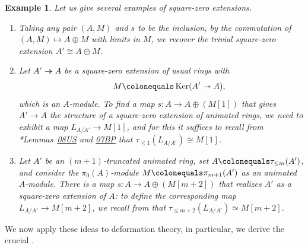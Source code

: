 \documentclass[11pt, reqno]{amsart}
\DeclareMathOperator{\Ker}{Ker}		%
\newcommand{\ce}{\colonequals}
\newcommand{\ra}{\rightarrow}
\newcommand{\surjects}{\twoheadrightarrow}
\newcommand{\benuma}{\begin{enumerate}[label={{\upshape(\arabic*)}}]}
\newcommand{\qq}{\quad\quad}
\numberwithin{equation}{numberingbase}
\theoremstyle{thms}
\theoremstyle{claims}
\theoremstyle{defs}
\newtheorem{example}[numberingbase]{Example}
\theoremstyle{thms}
\theoremstyle{defs}
\theoremstyle{subsection-tweak}
\theoremstyle{subsection-tweak}
\begin{document}
\begin{example} \label{sq-zero-eg}
Let us give several examples of square-zero extensions.
\benuma
\item Taking any pair $(A,M)$ and $s$ to be the inclusion, by the commutation of $(A,M)\mapsto A\oplus M$ with limits in $M$, we recover the trivial square-zero extension $A' \cong A\oplus M$. %

\item \label{sq-0-2}
Let $A'\surjects A$ be a square-zero extension of usual rings with 
\[
\qq M \ce \Ker(A'\surjects A),
\]
which is an $A$-module. To find a map $s\colon A\to A\oplus (M[1])$ that gives $A'\to A$ the structure of a square-zero extension of animated rings, we need to exhibit  a map $L_{A/A'}\to M[1]$, and for this it suffices to recall from \cite{SP}*{Lemmas~\href{https://stacks.math.columbia.edu/tag/08US}{08US} and \href{https://stacks.math.columbia.edu/tag/07BP}{07BP}} that $\tau_{\leq 1} (L_{A/A'}) \cong M[1]$.

\item \label{sq-0-3}
Let $A'$ be an $(m+1)$-truncated animated ring, set $A \ce \tau_{\leq m} (A')$, and consider the $\pi_0( A)$-module $M\ce \pi_{m+1}( A')$ as an animated $A$-module. There is a map $s\colon A\to A\oplus (M[m+2])$ that realizes $A'$ as a square-zero extension of $A$: to define the corresponding map $L_{A/A'} \ra M[m + 2]$, we recall from \cite[Proposition~25.3.6.1]{SAG} that $\tau_{\leq m+2} (L_{A/A'})\simeq M[m+2]$.
\end{enumerate}
\end{example}




We now apply these ideas to deformation theory, in particular, we derive the crucial  .
\end{document}

